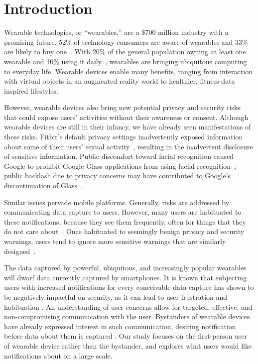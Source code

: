 
\section{Introduction}

Wearable technologies, or ``wearables,'' are a \$700 million industry \cite{cmo} with a promising future. 52\% of technology consumers are aware of wearables and 33\% are likely to buy one~\cite{NPD}. With 20\% of the general population owning at least one wearable and 10\% using it daily~\cite{WearableStatNews}, wearables are bringing ubiquitous computing to everyday life. Wearable devices enable many benefits, ranging from interaction with virtual objects in an augmented reality world to healthier, fitness-data inspired lifestyles. 

However, wearable devices also bring new potential privacy and security risks that could expose users' activities without their awareness or consent. Although wearable devices are still in their infancy, we have already seen manifestations of these risks. Fitbit's default privacy settings inadvertently exposed information about some of their users' sexual activity~\cite{Fitbit}, resulting in the inadvertent disclosure of sensitive information. Public discomfort toward facial recognition caused Google to prohibit Google Glass applications from using facial recognition~\cite{GlassDetection}; public backlash due to privacy concerns may have contributed to Google's discontinuation of Glass~\cite{1_russell_2014, 16_gross_2014}.

Similar issues pervade mobile platforms.  Generally, risks are addressed by communicating data capture to users. However, many users are habituated to these notifications, because they see them frequently, often for things that they do not care about~\cite{felt2012android}. Once habituated to seemingly benign privacy and security warnings, users tend to ignore more sensitive warnings that are similarly designed~\cite{Egelman08}.

The data captured by powerful, ubiquitous, and increasingly popular wearables will dwarf data currently captured by smartphones. It is known that subjecting users with increased notifications for every conceivable data capture has shown to be negatively impactful on security, as it can lead to user frustration and habituation \cite{bohme2011security}. An understanding of user concerns allow for targeted, effective, and non-compromising communication with the user. Bystanders of wearable devices have already expressed interest in such communication, desiring notification before data about them is captured \cite{denning2014situ}. Our study focuses on the first-person user of wearable device rather than the bystander, and explores what users would like notifications about on a large scale. 

